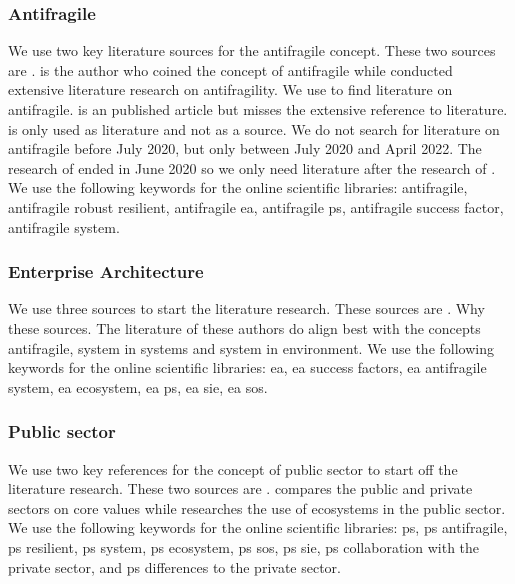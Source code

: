 \subsubsection{Antifragile}
\label{subsub:antifragile}
We use two key literature sources for the \gls{antifragile} concept. These two sources are \textcites{Taleb2012}{Botjes2020}{Botjes2021}. \textcite{Taleb2018} is the author who coined the concept of \gls{antifragile} while \textcite{Botjes2020} conducted extensive literature research on \gls{antifragility}. We use \textcite{Botjes2020} to find literature on antifragile. \textcite{Botjes2021} is an published article but misses the extensive reference to literature. \textcite{Botjes2021} is only used as literature and not as a source. We do not search for literature on antifragile before July 2020, but only between July 2020 and April 2022. The research of \textcite{Botjes2020} ended in June 2020 so we only need literature after the research of \textcite{Botjes2020}. We use the following keywords for the online scientific libraries: \gls{antifragile}, \gls{antifragile} \gls{robust} \gls{resilient}, \gls{antifragile} \acrlong{ea}, \gls{antifragile} \gls{ps}, \gls{antifragile} success factor, \gls{antifragile} system.

\subsubsection{Enterprise Architecture}
\label{subsub:enterprisearchitecture}
We use three sources to start the literature research. These sources are \textcites{Graves2008}{Hoogervorst2009}{Lapalme2012b}. Why these sources. The literature of these authors do align best with the concepts antifragile, system in systems and system in environment. We use the following keywords for the online scientific libraries: \acrlong{ea}, \acrlong{ea} success factors, \acrlong{ea} \gls{antifragile} system, \acrlong{ea} ecosystem, \acrlong{ea} \gls{ps}, \acrlong{ea} \acrlong{sie}, \acrlong{ea} \acrlong{sos}.

\subsubsection{Public sector}
\label{subsub:publicsector}
We use two key references for the concept of public sector to start off the literature research. These two sources are \textcites{Wal2008}{Nurmi2021}. \textcite{Wal2008} compares the public and private sectors on core values while \textcite{Nurmi2021} researches the use of ecosystems in the public sector. We use the following keywords for the online scientific libraries: \gls{ps}, \gls{ps} \gls{antifragile}, \gls{ps} \gls{resilient}, \gls{ps} system, \gls{ps} ecosystem, \gls{ps} \acrlong{sos}, \gls{ps} \acrlong{sie}, \gls{ps} collaboration with the private sector, and \gls{ps} differences to the private sector.

